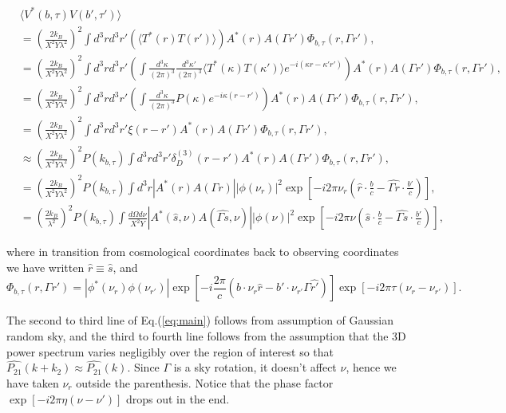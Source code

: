 \documentclass[preprint2,numberedappendix,tighten,twocolappendix]{aastex6}  %
\renewcommand\[{\begin{equation}}
\renewcommand\]{\end{equation}}
\begin{document}
\begin{widetext}
\begin{equation}
\begin{aligned} & \langle V^{*}(b,\tau)V(b',\tau')\rangle\\
 & =\left(\frac{2k_{B}}{X^{2}Y\lambda^{2}}\right)^{2}\int d^{3}rd^{3}r'\left(\langle T^{*}(r)T(r')\rangle\right)A^{*}(r)A(\Gamma r')\Phi_{b,\tau}(r,\Gamma r'),\\
 & =\left(\frac{2k_{B}}{X^{2}Y\lambda^{2}}\right)^{2}\int d^{3}rd^{3}r'\left(\int\frac{d^{3}\kappa}{(2\pi)^{3}}\frac{d^{3}\kappa'}{(2\pi)^{3}}\langle T^{*}(\kappa)T(\kappa')\rangle e^{-i(\kappa r-\kappa'r')}\right)A^{*}(r)A(\Gamma r')\Phi_{b,\tau}(r,\Gamma r'),\\
 & =\left(\frac{2k_{B}}{X^{2}Y\lambda^{2}}\right)^{2}\int d^{3}rd^{3}r'\left(\int\frac{d^{3}\kappa}{(2\pi)^{3}}P(\kappa)e^{-i\kappa(r-r')}\right)A^{*}(r)A(\Gamma r')\Phi_{b,\tau}(r,\Gamma r'),\\
 & =\left(\frac{2k_{B}}{X^{2}Y\lambda^{2}}\right)^{2}\int d^{3}rd^{3}r'\xi(r-r')A^{*}(r)A(\Gamma r')\Phi_{b,\tau}(r,\Gamma r'),\\
 & \approx\left(\frac{2k_{B}}{X^{2}Y\lambda^{2}}\right)^{2}P(k_{b,\tau})\int d^{3}rd^{3}r'\delta_{D}^{(3)}(r-r')A^{*}(r)A(\Gamma r')\Phi_{b,\tau}(r,\Gamma r'),\\
 & =\left(\frac{2k_{B}}{X^{2}Y\lambda^{2}}\right)^{2}P(k_{b,\tau})\int d^{3}r|A^{*}(r)A(\Gamma r)||\phi(\nu_{r})|^{2}\exp\left[-i2\pi\nu_{r}\left(\hat{r}\cdot\frac{b}{c}-\hat{\Gamma r}\cdot\frac{b'}{c}\right)\right],\\
 & =\left(\frac{2k_{B}}{\lambda^{2}}\right)^{2}P(k_{b,\tau})\int\frac{d\Omega d\nu}{X^{2}Y}|A^{*}(\hat{s},\nu)A(\hat{\Gamma s},\nu)||\phi(\nu)|^{2}\exp\left[-i2\pi\nu\left(\hat{s}\cdot\frac{b}{c}-\hat{\Gamma s}\cdot\frac{b'}{c}\right)\right],
\end{aligned}
\label{eq:main}
\end{equation}

where in transition from cosmological coordinates back to observing coordinates we have written $\hat{r}\equiv\hat{s}$, and 
\begin{equation}
\Phi_{b,\tau}(r,\Gamma r')=|{\phi^{*}}(\ensuremath{\nu_{r}})\phi(\nu_{r'})|\exp\left[-i\frac{2\pi}{c}\left(b\cdot\nu_{r}\hat{r}-b'\cdot\nu_{r'}\Gamma\hat{r'}\right)\right]\exp\left[-i2\pi\tau\left(\nu_{r}-\nu_{r'}\right)\right].
\end{equation}
\end{widetext}
The second to third line of Eq.(\ref{eq:main}) follows from assumption of Gaussian random
sky, and the third to fourth line follows from the assumption that
the 3D power spectrum varies negligibly over the region of interest
so that $\hat{P_{21}}(k+k_{2})\approx\hat{P_{21}}(k)$. Since $\Gamma$
is a sky rotation, it doesn't affect $\nu$, hence we have taken $\nu_{r}$
outside the parenthesis. Notice that the phase factor $\exp\left[-i2\pi\eta\left(\nu-\nu'\right)\right]$
drops out in the end. 
\end{document}
